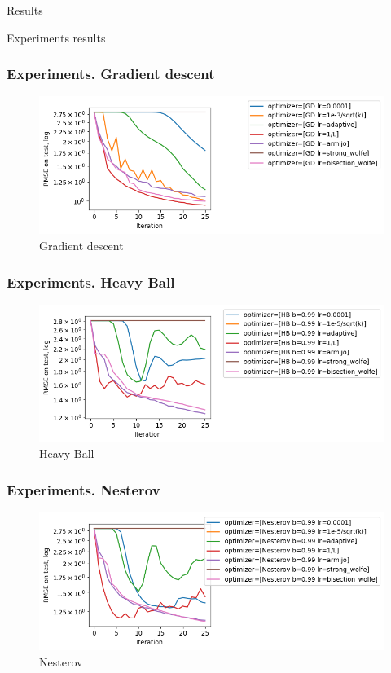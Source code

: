 \documentclass[pdf,10pt]{beamer}
\begin{document}
\begin{section}{Results}
 \begin{subsection}{Experiments results}
   \begin{frame}
     \frametitle{Experiments. Gradient descent}
     \begin{figure}[H]
       \centering
       \includegraphics[width=\textwidth,keepaspectratio]{../data/gd.png}
       \caption[Gradient descent]{Gradient descent}\label{fig:gd}
     \end{figure}
   \end{frame}

   \begin{frame}
     \frametitle{Experiments. Heavy Ball}
     \begin{figure}[H]
       \centering
       \includegraphics[width=\textwidth,keepaspectratio]{../data/hb.png}
       \caption[Heavy Ball]{Heavy Ball}\label{fig:hb}
     \end{figure}
   \end{frame}

   \begin{frame}
     \frametitle{Experiments. Nesterov}
     \begin{figure}[H]
       \centering
       \includegraphics[width=\textwidth,keepaspectratio]{../data/Nesterov.png}
       \caption[Nesterov]{Nesterov}\label{fig:nesterov}
     \end{figure}
   \end{frame}


\end{subsection}
\end{section}
\end{document}
